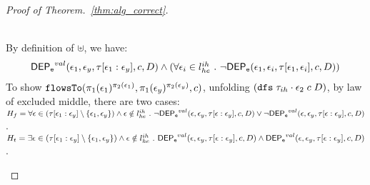 \begin{proof}[Proof of Theorem.~\ref{thm:alg_correct}]
\begin{case}
\begin{subcase}
\begin{subsubcase}
%
%
\\
By definition of $\uplus$, we have:
\[
\begin{array}{l}
  \eventdep^{val}(\event_1, \event_y, \trace[\event_1:\event_y], c, D)
  \land (\forall \event_i \in l^{ih}_{he} \st \neg \eventdep(\event_1, \event_i, \trace[\event_1, \event_i], c, D))
  \end{array}
\]
%
%
To show $\flowsto(\pi_1(\event_1)^{\pi_2(\event_1)}, \pi_1(\event_y)^{\pi_2(\event_y)}, c)$, 
%
unfolding $ (\kw{dfs} \eapp {\trace_{ih} \cdot \event_2} \eapp c \eapp D)$, by law of excluded middle,   there are two cases:
\\
$H_f =  \forall \event \in (\trace[\event_1:\event_y]\setminus \{\event_1, \event_y\}) 
 \land \event \notin l^{ih}_{he} \st
\neg \eventdep^{val} (\event, \event_y, \trace[\event:\event_y], c, D) \lor \neg \eventdep^{val} (\event, \event_y, \trace[\event:\event_y], c, D)$.
\\
$H_t = \exists \event \in (\trace[\event_1:\event_y]\setminus \{\event_1, \event_y\}) 
\land \event \notin l^{ih}_{he} \st
\eventdep^{val} (\event, \event_y, \trace[\event:\event_y], c, D) \land \eventdep^{val} (\event, \event_y, \trace[\event:\event_y], c, D)$.

\end{subsubcase}
\end{subcase}
\end{case}
\end{proof}
